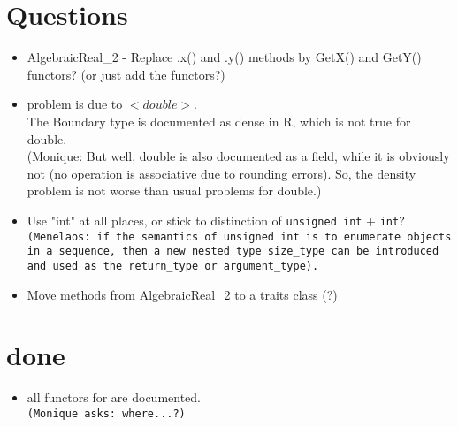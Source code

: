 \section{Questions}
\begin{itemize}
\item AlgebraicReal\_2 - Replace .x() and .y() methods by GetX() and 
	GetY() functors? (or just add the functors?)
\item problem is due to $<double>$.\\
    The Boundary type is documented as dense in R, which is not true
    for double.\\ (Monique: But well, double is also documented as a
    field, while it is obviously not (no operation is associative
    due to rounding errors). So, the density problem is not worse
    than usual problems for double.)
\item Use "int" at all places, or stick to distinction of \texttt{unsigned
   int} + \texttt{int}?\\
   \texttt{(Menelaos: if the semantics of \texttt{unsigned int} is to enumerate
   objects in a sequence, then a new nested type \texttt{size\_type}
   can be introduced and used as the \texttt{return\_type} or
   \texttt{argument\_type}).}
\end{itemize}

\begin{itemize}
\item Move methods from AlgebraicReal\_2 to a traits class (?)
\end{itemize}

\section{done} 
\begin{itemize}
\item all functors for  
      are documented. \\ \texttt{(Monique asks: where...?)}
\end{itemize}

